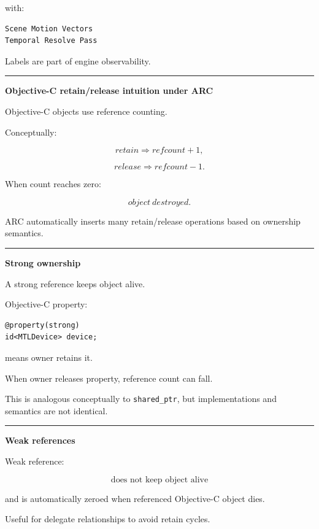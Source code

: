 with:

\begin{verbatim}
Scene Motion Vectors
Temporal Resolve Pass
\end{verbatim}

Labels are part of engine observability.

\begin{center}\rule{0.5\linewidth}{0.5pt}\end{center}

\textbf{Objective-C retain/release intuition under ARC}

Objective-C objects use reference counting.

Conceptually:

\[
retain
\Rightarrow
refcount+1,
\]

\[
release
\Rightarrow
refcount-1.
\]

When count reaches zero:

\[
object\ destroyed.
\]

ARC automatically inserts many retain/release operations based on ownership semantics.

\begin{center}\rule{0.5\linewidth}{0.5pt}\end{center}

\textbf{Strong ownership}

A strong reference keeps object alive.

Objective-C property:

\begin{verbatim}
@property(strong)
id<MTLDevice> device;
\end{verbatim}

means owner retains it.

When owner releases property, reference count can fall.

This is analogous conceptually to \texttt{shared\_ptr}, but implementations and semantics are not identical.

\begin{center}\rule{0.5\linewidth}{0.5pt}\end{center}

\textbf{Weak references}

Weak reference:

\[
\boxed{\text{does not keep object alive}}
\]

and is automatically zeroed when referenced Objective-C object dies.

Useful for delegate relationships to avoid retain cycles.

